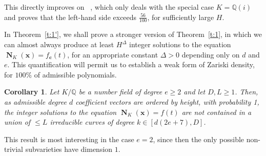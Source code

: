 \documentclass[11pt,letterpaper]{amsart}
\renewcommand{\leq}{\leqslant}
\renewcommand{\geq}{\geqslant}
\newtheorem{corollary}[theorem]{Corollary}
\theoremstyle{definition}
\numberwithin{equation}{section}
\newcommand\QQ{\mathbb{Q}}
\newcommand{\x}{\mathbf{x}}
\DeclareMathOperator{\nf}{\mathbf{N}}
\newcommand{\0}{\mathbf{0}}
\begin{document}
This directly improves on 
~\cite[Cor.~7.2]{SS}, which only deals with the special case $K=\QQ(i)$ and proves that the left-hand side exceeds 
$\frac{56}{100}$,
for sufficiently large $H$.


In Theorem~\ref{t:1'}, we shall prove a stronger version of Theorem~\ref{t:1}, in which we can almost always produce at least $H^\Delta$ integer solutions to the equation 
$\nf_{K}(\mathbf{x})=f_{\mathbf{c}}(t)$, for an appropriate constant $\Delta>0$ depending only on $d$ and $e$. 
This quantification will permit us to 
establish a weak form of Zariski density, for $100\%$ of admissible polynomials.

\begin{corollary}\label{cor:zariski}
Let $K/\QQ$ be a number field of degree $e\geq 2$
and  let $D,L\geq 1$. Then, 
as admissible   degree $d$ coefficient vectors are ordered by height, 
with probability 1, the integer solutions to the equation 
$\nf_K(\x)=f(t)$  are not contained in a union of  $\leq L$ irreducible curves of degree $k\in [d(2e+7),D]$.
\end{corollary}

This result is most interesting in the case $e=2$, since then the only possible non-trivial subvarieties have dimension $1$. 
\end{document}
